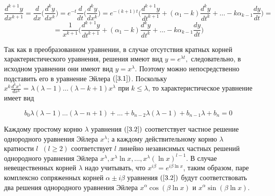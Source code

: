 \begin{equation}
    \frac{d^{k+1}y}{dx^{k+1}}=\frac{d}{dx}\Big(\frac{d^ky}{dx^k}\Big)=e^{-t}\frac{d}{dt}\Big(\frac{d^ky}{dx^k}\Big)=e^{-(k+1)t}\Big(\frac{d^{k+1}y}{dt^{k+1}}+(\alpha_1-k)\frac{d^ky}{dt^k}+\dots-k\alpha_{k-1}\frac{dy}{dt}\Big) =
\end{equation}
\begin{equation}
    = \frac{1}{x^{k+1}} \Big(\frac{d^{k+1} y}{dt^{k+1}}+(\alpha_1 - k) \frac{d^k y}{dt^k} + \dots - k \alpha_{k-1} \frac{dy}{dt}\Big)
\end{equation}

Так как в преобразованном уравнении, в случае отсутствия кратных корней характеристического уравнения, решения имеют вид $y=e^{\lambda t},$ следовательно, в исходном уравнении они имеют вид $y=x^\lambda$. Поэтому можно непосредственно подставить его в уравнение Эйлера $(\ref{3.1})$. Поскольку $x^k\frac{d^kx^\lambda}{dx^k}=\lambda(\lambda-1)\dots(\lambda-k+1)x^\lambda$ при $k\leqslant\lambda$, то характеристическое уравнение имеет вид

\begin{equation}
    \tag{3.2}
    \label{3.2}
    b_0\lambda(\lambda-1)\dots(\lambda-n+1)+\dots+b_{n-2}\lambda(\lambda-1)+b_{n-1}\lambda+b_n=0
\end{equation}

Каждому простому корню $\lambda$ уравнения $(\ref{3.2})$ соответствует частное решение однородного уравнения Эйлера $x^\lambda$; а каждому действительному корню $\lambda$ кратности $l\;\;(l\geqslant2)$ соответствует $l$ линейно независимых частных решений однородного уравнения Эйлера $x^\lambda, x^\lambda\ln{x}, \dots, x^\lambda(\ln{x})^{l-1}$. В случае невещественных корней $\lambda$ надо учитывать, что $x^{i\beta}=e^{i\beta\ln{x}}$, таким образом, паре комплексно сопряженных корней $\alpha\pm i\beta$ уравнения $(\ref{3.2})$ будут соответствовать два решения однородного уравнения Эйлера $x^\alpha\cos{(\beta\ln x)}$ и $x^\alpha\sin{(\beta\ln{x})}$.
